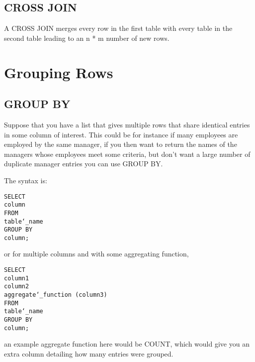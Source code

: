\documentclass[10pt, english]{article}
\begin{document}
\subsection{CROSS JOIN}
A CROSS JOIN merges every row in the first table with every table in the second table leading to an n * m number of new rows.

\section{Grouping Rows}
\subsection{GROUP BY}
Suppose that you have a list that gives multiple rows that share identical entries in some column of interest. This could be for instance if many employees are employed by the same manager,
if you then want to return the names of the managers whose employees meet some criteria, but don't want a large number 
of duplicate manager entries you can use GROUP BY.

The syntax is: 

\texttt{SELECT\\
\hspace*{10pt} column \\
FROM \\
\hspace*{10pt} table\char`_name\\
GROUP BY \\
\hspace*{10pt} column;
}

or for multiple columns and with some aggregating function,

\texttt{SELECT\\
\hspace*{10pt} column1 \\
\hspace*{10pt} column2 \\
\hspace*{10pt} aggregate\char`_function (column3) \\
FROM \\
\hspace*{10pt} table\char`_name\\
GROUP BY \\
\hspace*{10pt} column;
}

an example aggregate function here would be COUNT, which would give you an extra column detailing how many entries were grouped.
\end{document}
